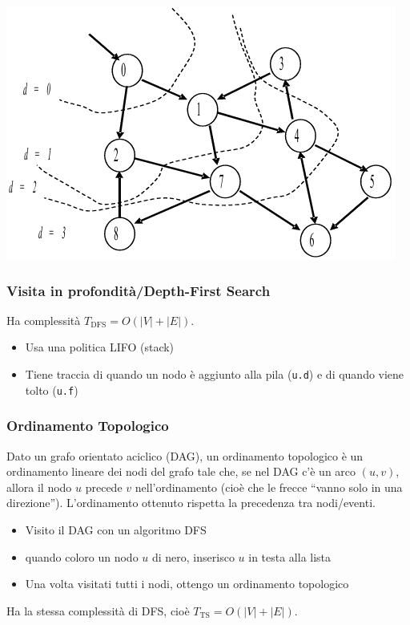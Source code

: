 \documentclass[10pt,a4paper]{article}
\newcommand{\code}{\texttt}
\begin{document}
\begin{multicols*}{2}
\centering
\includegraphics[width=0.7\linewidth]{graph_bfs.png}
\justifying

\subsubsection*{Visita in profondità/Depth-First Search}
Ha complessità $T_\text{DFS} = O(|V| + |E|)$.
\begin{itemize}
    \item Usa una politica LIFO (stack)
    \item Tiene traccia di quando un nodo è aggiunto alla pila (\code{u.d}) e di quando viene tolto (\code{u.f})
\end{itemize}

\subsubsection*{Ordinamento Topologico}
Dato un grafo orientato aciclico (DAG), un ordinamento topologico è un ordinamento lineare dei nodi del grafo tale che, se nel DAG c'è un arco $(u,v)$, allora il nodo $u$ precede $v$ nell'ordinamento (cioè che le frecce ``vanno solo in una direzione''). L'ordinamento ottenuto rispetta la precedenza tra nodi/eventi.
\begin{itemize}
    \item Visito il DAG con un algoritmo DFS
    \item quando coloro un nodo $u$ di nero, inserisco $u$ in testa alla lista
    \item Una volta visitati tutti i nodi, ottengo un ordinamento topologico 
\end{itemize}
Ha la stessa complessità di DFS, cioè $T_\text{TS} = O(|V| + |E|)$.


\end{multicols*}
\end{document}
